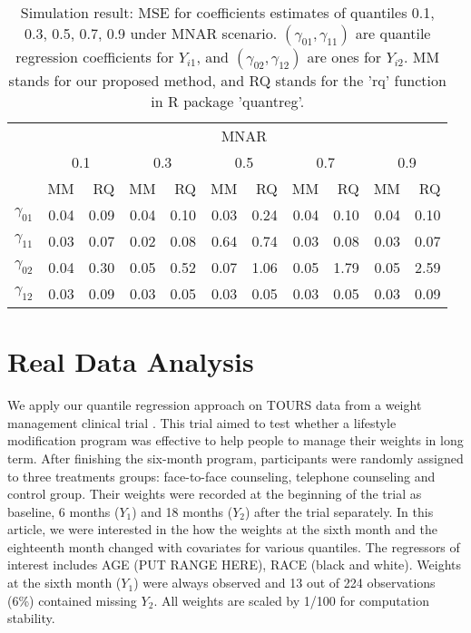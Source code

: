 \documentclass[12pt]{article}
\begin{document}
\begin{table}[h]
  \renewcommand{\arraystretch}{1.3}
  \centering
  \caption{Simulation result: MSE for coefficients estimates of quantiles
    0.1, 0.3, 0.5, 0.7, 0.9 under MNAR scenario. $(\gamma_{01}, \gamma_{11})$
    are quantile regression coefficients for $Y_{i1}$, and $(\gamma_{02}, \gamma_{12})$
    are ones for $Y_{i2}$. MM stands for our proposed method, and RQ stands for the 'rq'
    function in R package 'quantreg'.}
  \vspace{10pt}
  \begin{tabular}{rrrrrrrrrrr}
    \toprule
    & \multicolumn{ 10}{c}{MNAR} \\
    \cline{2-11}
    &  \multicolumn{2}{c}{0.1} &  \multicolumn{2}{c}{0.3} &  \multicolumn{2}{c}{0.5}
    &  \multicolumn{2}{c}{0.7} &  \multicolumn{2}{c}{0.9} \\
    \cline{2-11}
    & MM & RQ    & MM & RQ    & MM & RQ    & MM & RQ    & MM & RQ \\
    \hline
    $\gamma_{01}$ & 0.04 &0.09&0.04 &0.10 &0.03 &0.24 &0.04 &0.10 &0.04 &0.10 \\
    $\gamma_{11}$ & 0.03 &0.07&0.02 &0.08 &0.64 &0.74 &0.03 &0.08 &0.03 &0.07 \\
    $\gamma_{02}$ & 0.04 &0.30&0.05 &0.52 &0.07 &1.06 &0.05 &1.79 &0.05 &2.59 \\
    $\gamma_{12}$ & 0.03 &0.09&0.03 &0.05 &0.03 &0.05 &0.03 &0.05 &0.03 &0.09 \\
    \bottomrule
  \end{tabular}  \label{tab:sim2}
\end{table}


\section{Real Data Analysis}
\label{sec:real}
We apply our quantile regression approach on TOURS data from a weight
management clinical trial \citep{perri2008extended}.  This trial aimed
to test whether a lifestyle modification program was effective to help
people to manage their weights in long term. After finishing the
six-month program, participants were randomly assigned to three
treatments groups: face-to-face counseling, telephone counseling and
control group. Their weights were recorded at the beginning of the
trial as baseline, 6 months ($Y_1$) and 18 months ($Y_2$) after the
trial separately. In this article, we were interested in the how the
weights at the sixth month and the eighteenth month changed with
covariates for various quantiles. The regressors of interest includes
AGE (PUT RANGE HERE), RACE (black and white). Weights at the sixth
month ($Y_1$) were always observed and 13 out of 224 observations
(6\%) contained missing $Y_2$. All weights are scaled by 1/100 for
computation stability.
\end{document}
